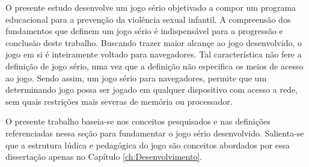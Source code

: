 O presente estudo desenvolve um jogo sério objetivado a compor um programa educacional para a prevenção da violência sexual infantil. A compreensão dos fundamentos que definem um jogo sério é indispensável para a progressão e conclusão deste trabalho. Buscando trazer maior alcançe ao jogo desenvolvido, o jogo em si é inteiramente voltado para navegadores. Tal característica não fere a definição de jogo sério, uma vez que a definição não especifica os meios de acesso ao jogo. Sendo assim, um jogo sério para navegadores, permite que um determinando jogo possa ser jogado em qualquer dispositivo com acesso a rede, sem quais restrições mais severas de memória ou processador. 

O presente trabalho baseia-se nos conceitos pesquisados e nas definições referenciadas nessa seção para fundamentar o jogo sério desenvolvido. Salienta-se que a estrutura lúdica e pedagógica do jogo são conceitos abordados por essa dissertação apenas no Capítulo \ref{ch:Desenvolvimento}.




\newpage



























